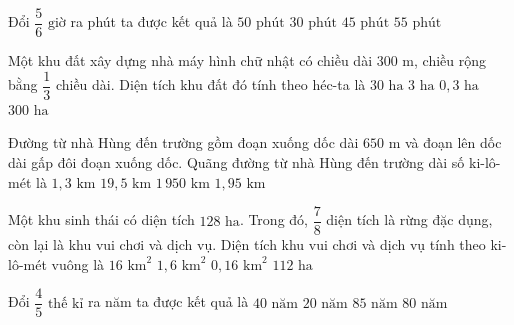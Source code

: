 \begin{ex} %
Đổi $\dfrac{5}{6}\text{ giờ}$ ra phút ta được kết quả là
\choice
{\True $50\text{ phút}$}
{$30\text{ phút}$}
{$45\text{ phút}$}
{$55\text{ phút}$}
\end{ex}

\begin{ex} %
Một khu đất xây dựng nhà máy hình chữ nhật có chiều dài $300\text{ m}$, chiều rộng bằng $\dfrac{1}{3}$ chiều dài. Diện tích khu đất đó tính theo héc-ta là
\choice
{$30\text{ ha}$}
{\True $3\text{ ha}$}
{$0{,}3\text{ ha}$}
{$300\text{ ha}$}
\end{ex}

\begin{ex} %
Đường từ nhà Hùng đến trường gồm đoạn xuống dốc dài $650\text{ m}$ và đoạn lên dốc dài gấp đôi đoạn xuống dốc. Quãng đường từ nhà Hùng đến trường dài số ki-lô-mét là
\choice
{$1{,}3\text{ km}$}
{$19{,}5\text{ km}$}
{$1\,950\text{ km}$}
{\True $1{,}95\text{ km}$}
\end{ex}

\begin{ex} %
Một khu sinh thái có diện tích $128\text{ ha}$. Trong đó, $\dfrac{7}{8}$ diện tích là rừng đặc dụng, còn lại là khu vui chơi và dịch vụ. Diện tích khu vui chơi và dịch vụ tính theo ki-lô-mét vuông là
\choice
{$16\text{ km}^2$}
{$1{,}6\text{ km}^2$}
{\True $0{,}16\text{ km}^2$}
{$112\text{ ha}$}
\end{ex}

\begin{ex} %
Đổi $\dfrac{4}{5}\text{ thế kỉ}$ ra năm ta được kết quả là
\choice
{$40\text{ năm}$}
{$20\text{ năm}$}
{$85\text{ năm}$}
{\True $80\text{ năm}$}
\end{ex}

